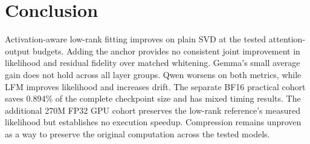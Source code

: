 \documentclass[conference]{IEEEtran}
\begin{document}
\section{Conclusion}
Activation-aware low-rank fitting improves on plain SVD at the tested attention-output budgets. Adding the anchor provides no consistent joint improvement in likelihood and residual fidelity over matched whitening. Gemma's small average gain does not hold across all layer groups. Qwen worsens on both metrics, while LFM improves likelihood and increases drift. The separate BF16 practical cohort saves 0.894\% of the complete checkpoint size and has mixed timing results. The additional 270M FP32 GPU cohort preserves the low-rank reference's measured likelihood but establishes no execution speedup. Compression remains unproven as a way to preserve the original computation across the tested models.\par\smallskip
\end{document}
